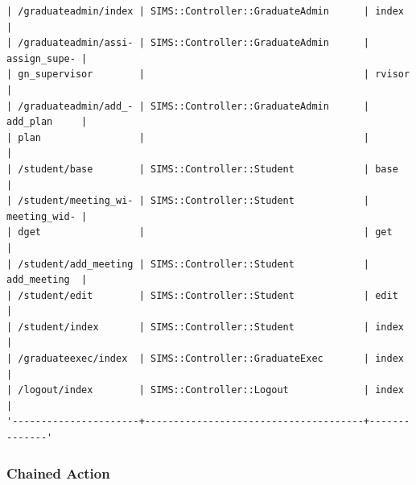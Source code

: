 \documentclass{journal}
\begin{document}
\begin{verbatim}
| /graduateadmin/index | SIMS::Controller::GraduateAdmin      | index        |
| /graduateadmin/assi- | SIMS::Controller::GraduateAdmin      | assign_supe- |
| gn_supervisor        |                                      | rvisor       |
| /graduateadmin/add_- | SIMS::Controller::GraduateAdmin      | add_plan     |
| plan                 |                                      |              |
| /student/base        | SIMS::Controller::Student            | base         |
| /student/meeting_wi- | SIMS::Controller::Student            | meeting_wid- |
| dget                 |                                      | get          |
| /student/add_meeting | SIMS::Controller::Student            | add_meeting  |
| /student/edit        | SIMS::Controller::Student            | edit         |
| /student/index       | SIMS::Controller::Student            | index        |
| /graduateexec/index  | SIMS::Controller::GraduateExec       | index        |
| /logout/index        | SIMS::Controller::Logout             | index        |
'----------------------+--------------------------------------+--------------'
\end{verbatim}


\subsubsection{Chained Action}
\end{document}
